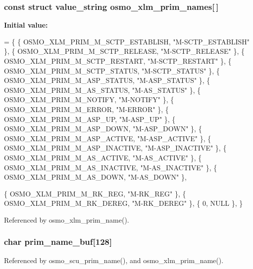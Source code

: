 \subsubsection[{osmo\+\_\+xlm\+\_\+prim\+\_\+names}]{\setlength{\rightskip}{0pt plus 5cm}const struct value\+\_\+string osmo\+\_\+xlm\+\_\+prim\+\_\+names[$\,$]}\label{sccp__sap_8c_a15c567cc2103dd74ca32374590b7574f}
{\bfseries Initial value\+:}
\begin{DoxyCode}
= \{
        \{ OSMO_XLM_PRIM_M_SCTP_ESTABLISH,       \textcolor{stringliteral}{"M-SCTP\_ESTABLISH"} \},
        \{ OSMO_XLM_PRIM_M_SCTP_RELEASE,         \textcolor{stringliteral}{"M-SCTP\_RELEASE"} \},
        \{ OSMO_XLM_PRIM_M_SCTP_RESTART,         \textcolor{stringliteral}{"M-SCTP\_RESTART"} \},
        \{ OSMO_XLM_PRIM_M_SCTP_STATUS,          \textcolor{stringliteral}{"M-SCTP\_STATUS"} \},
        \{ OSMO_XLM_PRIM_M_ASP_STATUS,           \textcolor{stringliteral}{"M-ASP\_STATUS"} \},
        \{ OSMO_XLM_PRIM_M_AS_STATUS,            \textcolor{stringliteral}{"M-AS\_STATUS"} \},
        \{ OSMO_XLM_PRIM_M_NOTIFY,               \textcolor{stringliteral}{"M-NOTIFY"} \},
        \{ OSMO_XLM_PRIM_M_ERROR,                \textcolor{stringliteral}{"M-ERROR"} \},
        \{ OSMO_XLM_PRIM_M_ASP_UP,               \textcolor{stringliteral}{"M-ASP\_UP"} \},
        \{ OSMO_XLM_PRIM_M_ASP_DOWN,             \textcolor{stringliteral}{"M-ASP\_DOWN"} \},
        \{ OSMO_XLM_PRIM_M_ASP_ACTIVE,           \textcolor{stringliteral}{"M-ASP\_ACTIVE"} \},
        \{ OSMO_XLM_PRIM_M_ASP_INACTIVE,         \textcolor{stringliteral}{"M-ASP\_INACTIVE"} \},
        \{ OSMO_XLM_PRIM_M_AS_ACTIVE,            \textcolor{stringliteral}{"M-AS\_ACTIVE"} \},
        \{ OSMO_XLM_PRIM_M_AS_INACTIVE,          \textcolor{stringliteral}{"M-AS\_INACTIVE"} \},
        \{ OSMO_XLM_PRIM_M_AS_DOWN,              \textcolor{stringliteral}{"M-AS\_DOWN"} \},
        
        \{ OSMO_XLM_PRIM_M_RK_REG,               \textcolor{stringliteral}{"M-RK\_REG"} \},
        \{ OSMO_XLM_PRIM_M_RK_DEREG,             \textcolor{stringliteral}{"M-RK\_DEREG"} \},
        \{ 0, NULL \},
\}
\end{DoxyCode}


Referenced by osmo\+\_\+xlm\+\_\+prim\+\_\+name().

\subsubsection[{prim\+\_\+name\+\_\+buf}]{\setlength{\rightskip}{0pt plus 5cm}char prim\+\_\+name\+\_\+buf[128]\hspace{0.3cm}{\ttfamily [static]}}\label{sccp__sap_8c_ade03488aec056a43cb6713c56c331c04}


Referenced by osmo\+\_\+scu\+\_\+prim\+\_\+name(), and osmo\+\_\+xlm\+\_\+prim\+\_\+name().

